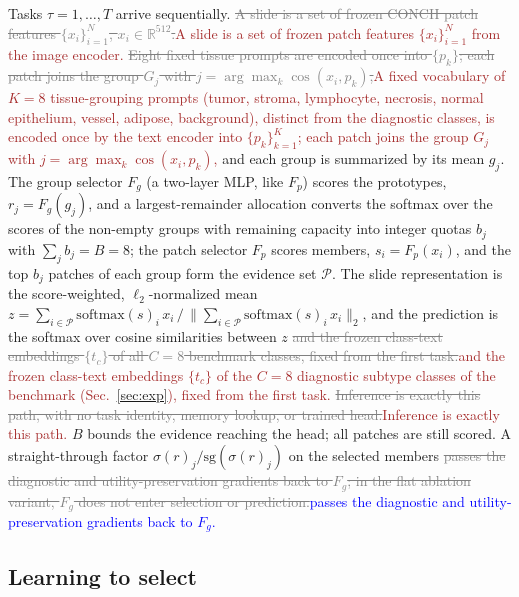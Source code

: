 \documentclass{article}
\newif\ifmarkup \markuptrue
\newcommand{\repc}[3]{\ifmarkup\textcolor{gray}{\sout{#2}}\textcolor{#1}{#3}\else#3\fi}
\newcommand{\repB}[2]{\repc{brown}{#1}{#2}}   %
\newcommand{\repL}[2]{\repc{blue}{#1}{#2}}    %
\newcommand{\Fg}{F_g}
\newcommand{\Fp}{F_p}
\newcommand{\Psel}{\mathcal{P}}
\begin{document}
Tasks $\tau=1,\ldots,T$ arrive sequentially. \repB{A slide is a set of frozen CONCH patch features $\{x_i\}_{i=1}^{N}$, $x_i\in\mathbb{R}^{512}$.}{A slide is a set of frozen patch features $\{x_i\}_{i=1}^{N}$ from the image encoder.} \repB{Eight fixed tissue prompts are encoded once into $\{p_k\}$; each patch joins the group $G_j$ with $j=\arg\max_k\cos(x_i,p_k)$,}{A fixed vocabulary of $K=8$ tissue-grouping prompts (tumor, stroma, lymphocyte, necrosis, normal epithelium, vessel, adipose, background), distinct from the diagnostic classes, is encoded once by the text encoder into $\{p_k\}_{k=1}^{K}$; each patch joins the group $G_j$ with $j=\arg\max_k\cos(x_i,p_k)$,} and each group is summarized by its mean $g_j$. The group selector $\Fg$ (a two-layer MLP, like $\Fp$) scores the prototypes, $r_j=\Fg(g_j)$, and a largest-remainder allocation converts the softmax over the scores of the non-empty groups with remaining capacity into integer quotas $b_j$ with $\sum_j b_j=B=8$; the patch selector $\Fp$ scores members, $s_i=\Fp(x_i)$, and the top $b_j$ patches of each group form the evidence set $\Psel$. The slide representation is the score-weighted, $\ell_2$-normalized mean $z=\sum_{i\in\Psel}\mathrm{softmax}(s)_i\,x_i\,/\,\bigl\|\sum_{i\in\Psel}\mathrm{softmax}(s)_i\,x_i\bigr\|_2$, and the prediction is the softmax over cosine similarities between $z$ \repB{and the frozen class-text embeddings $\{t_c\}$ of all $C=8$ benchmark classes, fixed from the first task.}{and the frozen class-text embeddings $\{t_c\}$ of the $C=8$ diagnostic subtype classes of the benchmark (Sec.~\ref{sec:exp}), fixed from the first task.} \repB{Inference is exactly this path, with no task identity, memory lookup, or trained head.}{Inference is exactly this path.} $B$ bounds the evidence reaching the head; all patches are still scored. A straight-through factor $\sigma(r)_j/\mathrm{sg}(\sigma(r)_j)$ on the selected members \repL{passes the diagnostic and utility-preservation gradients back to $\Fg$; in the flat ablation variant, $\Fg$ does not enter selection or prediction.}{passes the diagnostic and utility-preservation gradients back to $\Fg$.}

\subsection{Learning to select}
\label{ssec:within}
\end{document}
